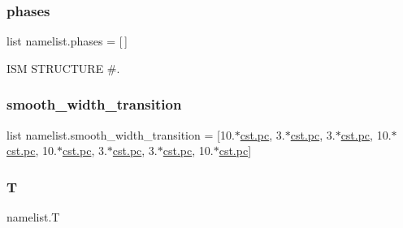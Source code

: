 \mbox{\label{namespacenamelist_a088873ff7532d7c6df70ef89db73afb3}} 
\subsubsection{\texorpdfstring{phases}{phases}}
{\footnotesize\ttfamily list namelist.\+phases = \mbox{[}$\,$\mbox{]}}



I\+SM S\+T\+R\+U\+C\+T\+U\+RE \#. 

\mbox{\label{namespacenamelist_a9c546acac0e1c573855acc22112a8909}} 
\subsubsection{\texorpdfstring{smooth\+\_\+width\+\_\+transition}{smooth\_width\_transition}}
{\footnotesize\ttfamily list namelist.\+smooth\+\_\+width\+\_\+transition = \mbox{[}10.$\ast$\hyperlink{constants_8h_a2884cd030c4c825754349a525a1d06ce}{cst.\+pc}, 3.$\ast$\hyperlink{constants_8h_a2884cd030c4c825754349a525a1d06ce}{cst.\+pc}, 3.$\ast$\hyperlink{constants_8h_a2884cd030c4c825754349a525a1d06ce}{cst.\+pc}, 10.$\ast$\hyperlink{constants_8h_a2884cd030c4c825754349a525a1d06ce}{cst.\+pc}, 10.$\ast$\hyperlink{constants_8h_a2884cd030c4c825754349a525a1d06ce}{cst.\+pc}, 3.$\ast$\hyperlink{constants_8h_a2884cd030c4c825754349a525a1d06ce}{cst.\+pc}, 3.$\ast$\hyperlink{constants_8h_a2884cd030c4c825754349a525a1d06ce}{cst.\+pc}, 10.$\ast$\hyperlink{constants_8h_a2884cd030c4c825754349a525a1d06ce}{cst.\+pc}\mbox{]}}

\mbox{\label{namespacenamelist_acc085fb18af4161be26b359a7e389498}} 
\subsubsection{\texorpdfstring{T}{T}}
{\footnotesize\ttfamily namelist.\+T}

\mbox{\label{namespacenamelist_a6c4d0bf6d00b16d29ca1ba57091d5167}} 
